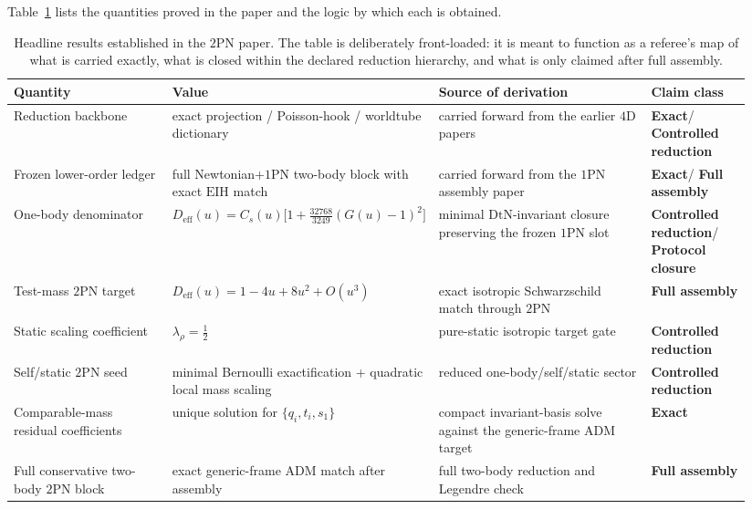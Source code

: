\documentclass[11pt]{article}
\newcommand{\OnePN}{\mathrm{1PN}}
\newcommand{\TwoPN}{\mathrm{2PN}}
\newcommand{\ADM}{\mathrm{ADM}}
\newcommand{\DtN}{\mathrm{DtN}}
\newcommand{\EIH}{\mathrm{EIH}}
\newcommand{\eff}{\mathrm{eff}}
\newcommand{\Exact}{\textbf{Exact}}
\newcommand{\Controlled}{\textbf{Controlled reduction}}
\newcommand{\Protocol}{\textbf{Protocol closure}}
\newcommand{\FullMatch}{\textbf{Full assembly}}
\begin{document}
Table~\ref{tab:executive-ledger} lists the quantities proved in the paper and the logic by which each is obtained.

\begin{table}[H]
  \centering
  \caption{Headline results established in the $\TwoPN$ paper. The table is deliberately front-loaded: it is meant to function as a referee's map of what is carried exactly, what is closed within the declared reduction hierarchy, and what is only claimed after full assembly.}
  \label{tab:executive-ledger}
  \small
  \setlength{\tabcolsep}{4pt}
  \renewcommand{\arraystretch}{1.18}
  \begin{tabularx}{\linewidth}{@{}>{\raggedright\arraybackslash}p{0.23\linewidth} >{\raggedright\arraybackslash}p{0.26\linewidth} >{\raggedright\arraybackslash}p{0.31\linewidth} >{\raggedright\arraybackslash}p{0.14\linewidth}@{}}
    \toprule
    Quantity & Value & Source of derivation & Claim class \\
    \midrule
    Reduction backbone & exact projection / Poisson-hook / worldtube dictionary & carried forward from the earlier $4$D papers & \Exact / \Controlled \\
    Frozen lower-order ledger & full Newtonian+$\OnePN$ two-body block with exact $\EIH$ match & carried forward from the $1$PN assembly paper & \Exact / \FullMatch \\
    One-body denominator & $D_{\eff}(u)=C_s(u)\bigl[1+\tfrac{32768}{3249}(G(u)-1)^2\bigr]$ & minimal $\DtN$-invariant closure preserving the frozen $1$PN slot & \Controlled / \Protocol \\
    Test-mass $\TwoPN$ target & $D_{\eff}(u)=1-4u+8u^2+O(u^3)$ & exact isotropic Schwarzschild match through $\TwoPN$ & \FullMatch \\
    Static scaling coefficient & $\lambda_\rho=\tfrac12$ & pure-static isotropic target gate & \Controlled \\
    Self/static $\TwoPN$ seed & minimal Bernoulli exactification + quadratic local mass scaling & reduced one-body/self/static sector & \Controlled \\
    Comparable-mass residual coefficients & unique solution for $\{q_i,t_i,s_1\}$ & compact invariant-basis solve against the generic-frame $\ADM$ target & \Exact \\
    Full conservative two-body $\TwoPN$ block & exact generic-frame $\ADM$ match after assembly & full two-body reduction and Legendre check & \FullMatch \\
    \bottomrule
  \end{tabularx}
\end{table}
\end{document}
